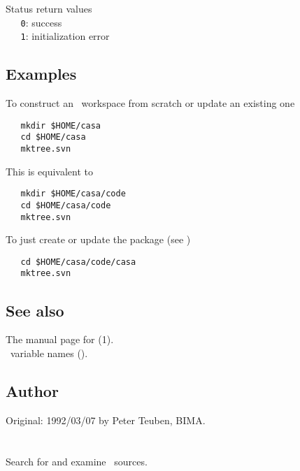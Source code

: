 Status return values
\\ \verb+   0+: success
\\ \verb+   1+: initialization error

\subsection*{Examples}

To construct an \aipspp\ workspace from scratch or update an existing one

\begin{verbatim}
   mkdir $HOME/casa
   cd $HOME/casa
   mktree.svn
\end{verbatim}

\noindent
This is equivalent to

\begin{verbatim}
   mkdir $HOME/casa/code
   cd $HOME/casa/code
   mktree.svn
\end{verbatim}

\noindent
To just create or update the  package (see )

\begin{verbatim}
   cd $HOME/casa/code/casa
   mktree.svn
\end{verbatim}

\subsection*{See also}

The manual page for (1).\\
\aipspp\ variable names ().\\

\subsection*{Author}

Original: 1992/03/07 by Peter Teuben, BIMA.
 
 

\newpage
\section{}
\label{squiz}

Search for and examine \aipspp\ sources.

